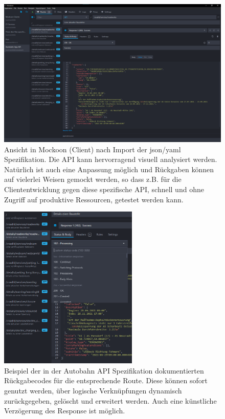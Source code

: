 \documentclass[notitlepage, hidelinks]{article}
\begin{document}
\begin{figure}[H]
\centering
  \includegraphics[width=\textwidth]{images/apispecs4.png}
  \caption{Ansicht in Mockoon (Client) nach Import der json/yaml Spezifikation. Die API kann hervorragend visuell analysiert werden. Natürlich ist auch eine Anpassung möglich und Rückgaben können auf vielerlei Weisen gemockt werden, so dass z.B. für die Cliententwicklung gegen diese spezifische API, schnell und ohne Zugriff auf produktive Ressourcen, getestet werden kann.}
  \label{apispecs4}
\end{figure}

\begin{figure}[H]
\centering
  \includegraphics[width=250px]{images/apispecs3.png}
  \caption{Beispiel der in der Autobahn API Spezifikation dokumentierten Rückgabecodes für die entsprechende Route. Diese können sofort genutzt werden, über logische Verknüpfungen dynamisch zurückgegeben, gelöscht und erweitert werden. Auch eine künstliche Verzögerung des Response ist möglich.}
  \label{apispecs3}
\end{figure}
\end{document}
